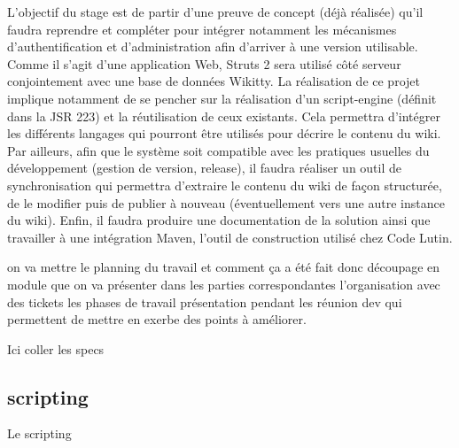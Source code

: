 L'objectif du stage est de partir d'une preuve de concept (déjà réalisée) qu'il faudra reprendre et
compléter pour intégrer notamment les mécanismes d'authentification et d'administration afin
d'arriver à une version utilisable. Comme il s'agit d'une application Web, Struts 2 sera utilisé côté
serveur conjointement avec une base de données Wikitty.
La réalisation de ce projet implique notamment de se pencher sur la réalisation d'un script-engine
(définit dans la JSR 223) et la réutilisation de ceux existants. Cela permettra d'intégrer les différents
langages qui pourront être utilisés pour décrire le contenu du wiki.
Par ailleurs, afin que le système soit compatible avec les pratiques usuelles du développement
(gestion de version, release), il faudra réaliser un outil de synchronisation qui permettra d'extraire le
contenu du wiki de façon structurée, de le modifier puis de publier à nouveau (éventuellement vers
une autre instance du wiki).
Enfin, il faudra produire une documentation de la solution ainsi que travailler à une intégration
Maven, l'outil de construction utilisé chez Code Lutin.





on va mettre le planning du travail et comment ça a été fait
donc découpage en module que on va présenter dans les parties correspondantes
l'organisation avec des tickets
les phases de travail
présentation pendant les réunion dev qui permettent de mettre en exerbe des
points à améliorer.




Ici coller les specs

\subsection{scripting}

Le scripting 

